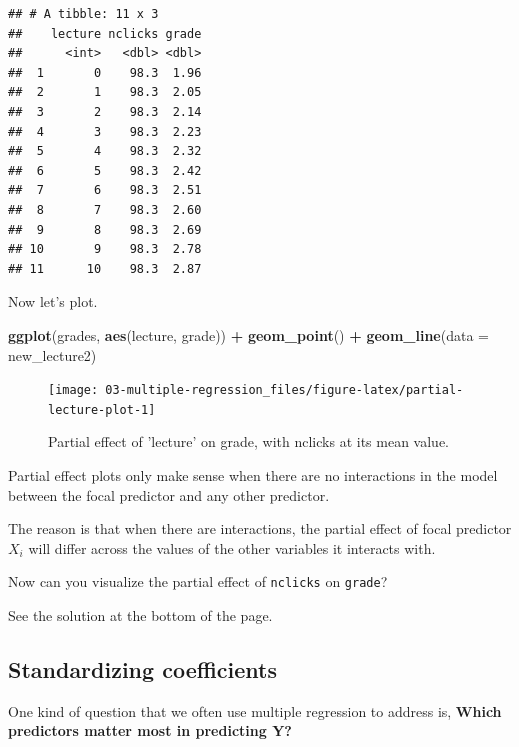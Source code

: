 \documentclass[]{book}
\newenvironment{Shaded}{\begin{snugshade}}{\end{snugshade}}
\newcommand{\DataTypeTok}[1]{\textcolor[rgb]{0.13,0.29,0.53}{#1}}
\newcommand{\KeywordTok}[1]{\textcolor[rgb]{0.13,0.29,0.53}{\textbf{#1}}}
\newcommand{\NormalTok}[1]{#1}
\newcommand{\OperatorTok}[1]{\textcolor[rgb]{0.81,0.36,0.00}{\textbf{#1}}}
\newcommand{\StringTok}[1]{\textcolor[rgb]{0.31,0.60,0.02}{#1}}
\begin{document}
\begin{verbatim}
## # A tibble: 11 x 3
##    lecture nclicks grade
##      <int>   <dbl> <dbl>
##  1       0    98.3  1.96
##  2       1    98.3  2.05
##  3       2    98.3  2.14
##  4       3    98.3  2.23
##  5       4    98.3  2.32
##  6       5    98.3  2.42
##  7       6    98.3  2.51
##  8       7    98.3  2.60
##  9       8    98.3  2.69
## 10       9    98.3  2.78
## 11      10    98.3  2.87
\end{verbatim}

Now let's plot.

\begin{Shaded}
\begin{Highlighting}[]
\KeywordTok{ggplot}\NormalTok{(grades, }\KeywordTok{aes}\NormalTok{(lecture, grade)) }\OperatorTok{+}\StringTok{ }
\StringTok{  }\KeywordTok{geom_point}\NormalTok{() }\OperatorTok{+}
\StringTok{  }\KeywordTok{geom_line}\NormalTok{(}\DataTypeTok{data =}\NormalTok{ new_lecture2)}
\end{Highlighting}
\end{Shaded}

\begin{figure}

{\centering \texttt{[image: 03-multiple-regression\_files/figure-latex/partial-lecture-plot-1]} 

}

\caption{Partial effect of 'lecture' on grade, with nclicks at its mean value.}\label{fig:partial-lecture-plot}
\end{figure}

Partial effect plots only make sense when there are no interactions in the model between the focal predictor and any other predictor.

The reason is that when there are interactions, the partial effect of focal predictor \(X_i\) will differ across the values of the other variables it interacts with.

Now can you visualize the partial effect of \texttt{nclicks} on \texttt{grade}?

See the solution at the bottom of the page.

\hypertarget{standardizing-coefficients}{%
\subsection{Standardizing coefficients}\label{standardizing-coefficients}}

One kind of question that we often use multiple regression to address is, \textbf{Which predictors matter most in predicting Y?}
\end{document}
